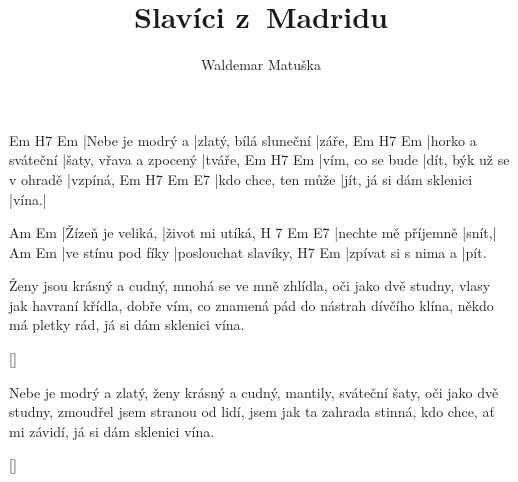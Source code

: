 \documentclass{song}
\title{Slavíci z~Madridu}
\author{Waldemar Matuška}
\begin{document}
\strophe
Em               H7                    Em
|Nebe je modrý a |zlatý, bílá sluneční |záře,
Em                H7                     Em
|horko a sváteční |šaty, vřava a zpocený |tváře,
Em               H7                       Em
|vím, co se bude |dít, býk už se v ohradě |vzpíná,
Em                  H7                       Em    E7
|kdo chce, ten může |jít, já si dám sklenici |vína.|
\endstrophe

Am                Em
|Žízeň je veliká, |život mi utíká,
H 7                 Em    E7
|nechte mě příjemně |snít,|
Am                 Em
|ve stínu pod fíky |poslouchat slavíky,
H7                  Em
|zpívat si s nima a |pít.
\endstrophe

\strophe*
Ženy jsou krásný a cudný, mnohá se ve mně zhlídla,
oči jako dvě studny, vlasy jak havraní křídla,
dobře vím, co znamená pád do nástrah dívčího klína,
někdo má pletky rád, já si dám sklenici vína.
\endstrophe

\ref{}

\strophe*
Nebe je modrý a zlatý, ženy krásný a cudný,
mantily, sváteční šaty, oči jako dvě studny,
zmoudřel jsem stranou od lidí, jsem jak ta zahrada stinná,
kdo chce, ať mi závidí, já si dám sklenici vína.
\endstrophe

\ref{}
\end{document}
